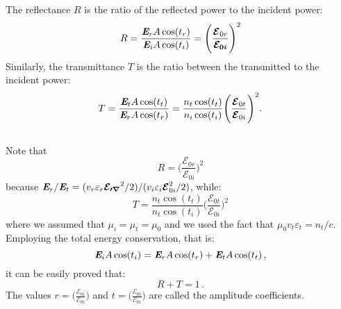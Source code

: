 The reflectance $R$ is the ratio of the reflected power to the incident power:
\begin{equation}\label{reflectance}
R = \frac{\textit{\textbf{E}}_r A\cos(t_r)}{\textit{\textbf{E}}_i A\cos(t_i)} =\Bigg(\frac{\boldsymbol{\mathcal{E}}_{0r}}{\boldsymbol{\mathcal{E}_{0i}}}\Bigg)^2
\end{equation}
Similarly, the transmittance $T$ is the ratio between the transmitted to the incident power:
\begin{equation}\label{transmittance}
T = \frac{\textit{\textbf{E}}_tA\cos(t_t)}{\textit{\textbf{E}}_r A\cos(t_r)}= \frac{n_t \cos(t_t)}{n_i\cos(t_i)}\Bigg(\frac{\boldsymbol{\mathcal{E}}_{0 t}}{\boldsymbol{\mathcal{E}}_{0 i}}\Bigg)^2.
\end{equation}\\
Note that 
\begin{equation}\label{R}
R = \Big(\frac{\boldsymbol{\mathcal{E}}_{0 r}}{\boldsymbol{\mathcal{E}}_{0 i}}\Big)^2
\end{equation}
because $\textit{\textbf{E}} _r/\textit{\textbf{E}}_t = (v_r\varepsilon_r \boldsymbol{\mathcal{E_{0r}}}^2/2)/(v_i\varepsilon_i \boldsymbol{\mathcal{E}}_{0i}^2/2)$, 
while: \begin{equation}\label{T}
T = \frac{n_t \cos(t_t)}{n_t \cos(t_i)}\Bigg(\frac{\boldsymbol{\mathcal{E}}_{0 t}}{\boldsymbol{\mathcal{E}}_{0 i}}\Bigg)^2
\end{equation}
where we assumed that $\mu_i = \mu_t  = \mu_0$ and we used the fact that $\mu_0 v_t\varepsilon_t=n_t/c$.
Employing the total energy conservation, that is:
\begin{equation}
\textit{\textbf{E}}_i A\cos(t_i) = \textit{\textbf{E}}_r A\cos(t_r)+\textit{\textbf{E}}_t A\cos(t_t)\,,
\end{equation}
it can be easily proved that:
\begin{equation}
R+T=1\,.
\end{equation}
The values $r = \Big(\frac{\boldsymbol{\mathcal{E}}_{0 i}}{\boldsymbol{\mathcal{E}}_{0 i}}\Big)$ and 
$t = \Big(\frac{\boldsymbol{\mathcal{E}}_{0 t}}{\boldsymbol{\mathcal{E}}_{0 i}}\Big)$ are called the amplitude coefficients.  

